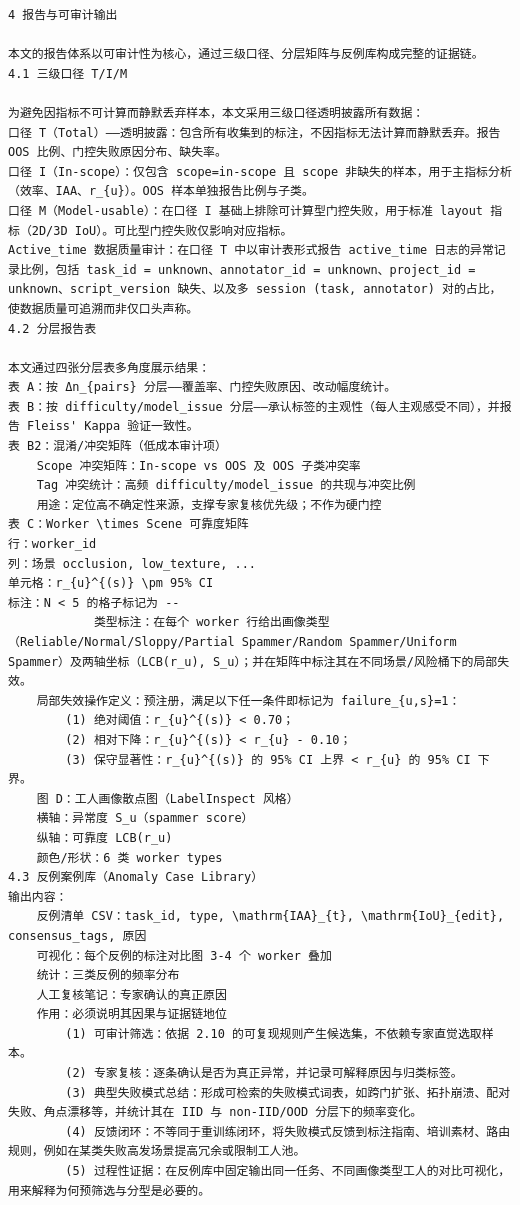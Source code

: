 \documentclass[a4paper,12pt]{article}
\begin{document}
\begin{Verbatim}[fontsize=\small,breaklines=true,breakanywhere=true]
4 报告与可审计输出

本文的报告体系以可审计性为核心，通过三级口径、分层矩阵与反例库构成完整的证据链。
4.1 三级口径 T/I/M

为避免因指标不可计算而静默丢弃样本，本文采用三级口径透明披露所有数据：
口径 T（Total）——透明披露：包含所有收集到的标注，不因指标无法计算而静默丢弃。报告 OOS 比例、门控失败原因分布、缺失率。
口径 I（In-scope）：仅包含 scope=in-scope 且 scope 非缺失的样本，用于主指标分析（效率、IAA、r_{u}）。OOS 样本单独报告比例与子类。
口径 M（Model-usable）：在口径 I 基础上排除可计算型门控失败，用于标准 layout 指标（2D/3D IoU）。可比型门控失败仅影响对应指标。
Active_time 数据质量审计：在口径 T 中以审计表形式报告 active_time 日志的异常记录比例，包括 task_id = unknown、annotator_id = unknown、project_id = unknown、script_version 缺失、以及多 session (task, annotator) 对的占比，使数据质量可追溯而非仅口头声称。
4.2 分层报告表

本文通过四张分层表多角度展示结果：
表 A：按 Δn_{pairs} 分层——覆盖率、门控失败原因、改动幅度统计。
表 B：按 difficulty/model_issue 分层——承认标签的主观性（每人主观感受不同），并报告 Fleiss' Kappa 验证一致性。
表 B2：混淆/冲突矩阵（低成本审计项）
	Scope 冲突矩阵：In-scope vs OOS 及 OOS 子类冲突率
	Tag 冲突统计：高频 difficulty/model_issue 的共现与冲突比例
	用途：定位高不确定性来源，支撑专家复核优先级；不作为硬门控
表 C：Worker \times Scene 可靠度矩阵
行：worker_id
列：场景 occlusion, low_texture, ...
单元格：r_{u}^{(s)} \pm 95% CI
标注：N < 5 的格子标记为 --
			类型标注：在每个 worker 行给出画像类型（Reliable/Normal/Sloppy/Partial Spammer/Random Spammer/Uniform Spammer）及两轴坐标（LCB(r_u), S_u）；并在矩阵中标注其在不同场景/风险桶下的局部失效。
	局部失效操作定义：预注册，满足以下任一条件即标记为 failure_{u,s}=1：
		(1) 绝对阈值：r_{u}^{(s)} < 0.70；
		(2) 相对下降：r_{u}^{(s)} < r_{u} - 0.10；
		(3) 保守显著性：r_{u}^{(s)} 的 95% CI 上界 < r_{u} 的 95% CI 下界。
	图 D：工人画像散点图（LabelInspect 风格）
	横轴：异常度 S_u（spammer score）
	纵轴：可靠度 LCB(r_u)
	颜色/形状：6 类 worker types
4.3 反例案例库（Anomaly Case Library）
输出内容：
	反例清单 CSV：task_id, type, \mathrm{IAA}_{t}, \mathrm{IoU}_{edit}, consensus_tags, 原因
	可视化：每个反例的标注对比图 3-4 个 worker 叠加
	统计：三类反例的频率分布
	人工复核笔记：专家确认的真正原因
	作用：必须说明其因果与证据链地位
		(1) 可审计筛选：依据 2.10 的可复现规则产生候选集，不依赖专家直觉选取样本。
		(2) 专家复核：逐条确认是否为真正异常，并记录可解释原因与归类标签。
		(3) 典型失败模式总结：形成可检索的失败模式词表，如跨门扩张、拓扑崩溃、配对失败、角点漂移等，并统计其在 IID 与 non-IID/OOD 分层下的频率变化。
		(4) 反馈闭环：不等同于重训练闭环，将失败模式反馈到标注指南、培训素材、路由规则，例如在某类失败高发场景提高冗余或限制工人池。
		(5) 过程性证据：在反例库中固定输出同一任务、不同画像类型工人的对比可视化，用来解释为何预筛选与分型是必要的。


\end{Verbatim}
\end{document}
